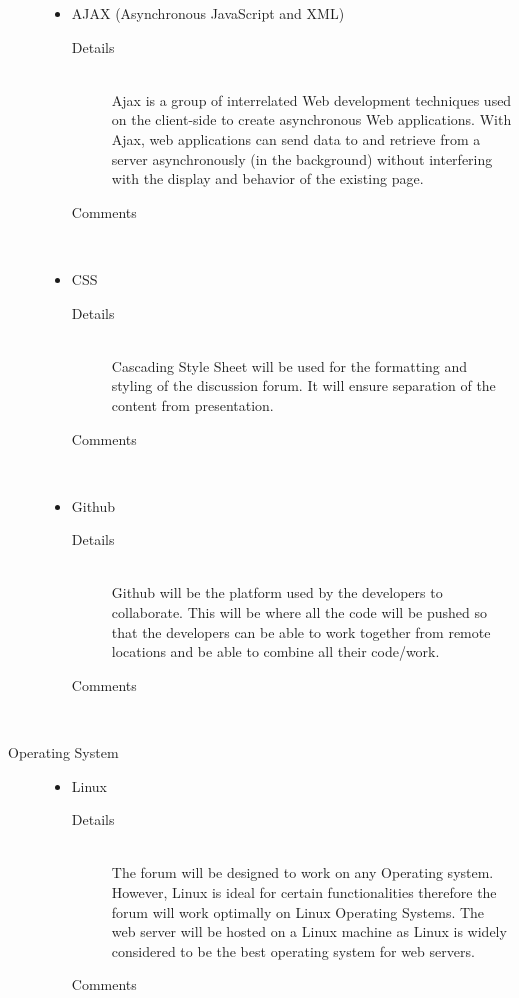 \documentclass[10pt]{article}
\begin{document}
\begin{description}
\begin{itemize}
\begin{description}
					\end{description}
				\item AJAX (Asynchronous JavaScript and XML)
					\begin{description}
						\item[Details] \hfill \\
							Ajax is a group of interrelated Web development techniques used on the client-side to create asynchronous Web applications.
							 With Ajax, web applications can send data to and retrieve from a server asynchronously (in the background) without interfering
							 with the display and behavior of the existing page.
						\item[Comments]\hfill \\		
					\end{description}
				\item CSS
					\begin{description}
						\item[Details] \hfill \\
							Cascading Style Sheet will be used for the formatting and styling of the discussion forum. It will ensure separation of the content from presentation.
						\item[Comments]\hfill \\
					\end{description}	
				\item Github
					\begin{description}
						\item[Details] \hfill \\
							Github will be the platform used by the developers to collaborate. This will be where all the code will be pushed so that the developers can be able to work together from remote locations and be able to combine all their code/work.
						\item[Comments]\hfill \\
					\end{description}
			\end{itemize}	
		\item[Operating System] \hfill 
			\begin{itemize}
				\item Linux
					\begin{description}
						\item[Details] \hfill \\
							The forum will  be designed to work on any Operating system. However, Linux is ideal for certain functionalities therefore the forum will work optimally on Linux Operating Systems. The web server will be hosted on a Linux machine as Linux is widely considered to be the best operating system  for web servers. 
						\item[Comments]\hfill \\
							

\end{description}
\end{itemize}
\end{description}
\end{document}
